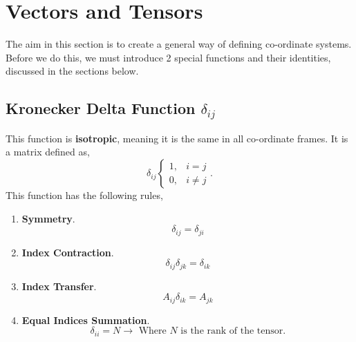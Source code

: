\documentclass{book}
\begin{document}
\section{Vectors and Tensors}
The aim in this section is to create a general way of defining co-ordinate systems. Before we do this, we must introduce 2 special functions and their identities, discussed in the sections below. 
\subsection{Kronecker Delta Function $\delta_{ij}$}
This function is \textbf{isotropic}, meaning it is the same in all co-ordinate frames. It is a matrix defined as,
\begin{equation}
    \delta_{ij}
    \begin{cases}
        1, & i = j \\
        0, & i \neq j
    \end{cases}.
\end{equation}
This function has the following rules,
\begin{enumerate}
    \item \textbf{Symmetry}. 
    \begin{equation}
        \delta_{ij} = \delta_{ji}
    \end{equation} 
    \item \textbf{Index Contraction}.
    \begin{equation}
        \delta_{ij}\delta_{jk} = \delta_{ik}
    \end{equation}
    \item \textbf{Index Transfer}.
    \begin{equation}
        A_{ij}\delta_{ik} = A_{jk} \label{4}
    \end{equation}
    \item \textbf{Equal Indices Summation}. 
    \begin{equation}
        \delta_{ii} = N \to \text{ Where $N$ is the rank of the tensor.}
    \end{equation}
\end{enumerate}
\end{document}
